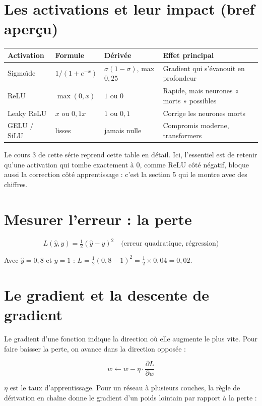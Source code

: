 \documentclass[11pt]{article}
\begin{document}
\section{Les activations et leur impact (bref aperçu)}

\begin{table}[h]
\centering
\small
\begin{tabular}{llll}
\toprule
Activation & Formule & Dérivée & Effet principal \\
\midrule
Sigmoïde & $1/(1+e^{-x})$ & $\sigma(1-\sigma)$, max $0{,}25$ & Gradient qui s'évanouit en profondeur \\
ReLU & $\max(0,x)$ & $1$ ou $0$ & Rapide, mais neurones « morts » possibles \\
Leaky ReLU & $x$ ou $0{,}1x$ & $1$ ou $0{,}1$ & Corrige les neurones morts \\
GELU / SiLU & lisses & jamais nulle & Compromis moderne, transformers \\
\bottomrule
\end{tabular}
\end{table}

Le cours 3 de cette série reprend cette table en détail. Ici, l'essentiel est de retenir qu'une activation qui tombe exactement à 0, comme ReLU côté négatif, bloque aussi la correction côté apprentissage : c'est la section 5 qui le montre avec des chiffres.

\section{Mesurer l'erreur : la perte}

\[ L(\hat y, y) = \tfrac{1}{2}(\hat y - y)^2 \quad \text{(erreur quadratique, régression)} \]

Avec $\hat y = 0{,}8$ et $y=1$ : $L = \tfrac12(0{,}8-1)^2 = \tfrac12 \times 0{,}04 = 0{,}02$.

\section{Le gradient et la descente de gradient}

Le gradient d'une fonction indique la direction où elle augmente le plus vite. Pour faire baisser la perte, on avance dans la direction opposée :

\[ w \leftarrow w - \eta \cdot \frac{\partial L}{\partial w} \]

$\eta$ est le taux d'apprentissage. Pour un réseau à plusieurs couches, la règle de dérivation en chaîne donne le gradient d'un poids lointain par rapport à la perte :
\end{document}
